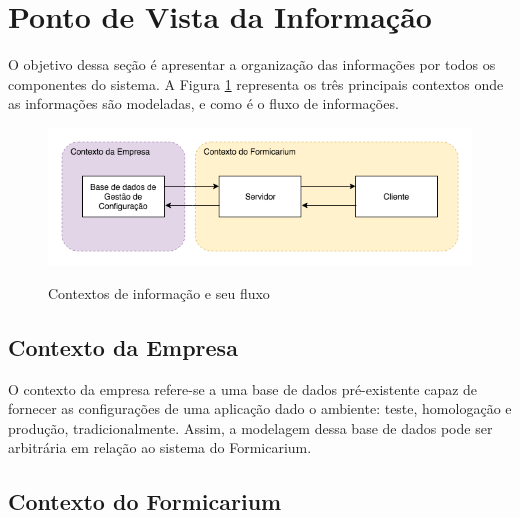 	\section{Ponto de Vista da Informação}
	    O objetivo dessa seção é apresentar a organização das informações por todos os componentes do sistema. A Figura \ref{fig:info-contexts} representa os três principais contextos onde as informações são modeladas, e como é o fluxo de informações. 
	    \begin{figure}[htb]
    	    \centering
    	    \caption{Contextos de informação e seu fluxo}
    	    \includegraphics[scale=0.67]{pictures/especificacao-de-requisitos/information-contexts.png}
    	    \label{fig:info-contexts}
	    \end{figure}
	    \subsection{Contexto da Empresa}
	        O contexto da empresa refere-se a uma base de dados pré-existente capaz de fornecer as configurações de uma aplicação dado o ambiente: teste, homologação e produção, tradicionalmente. Assim, a modelagem dessa base de dados pode ser arbitrária em relação ao sistema do Formicarium.
	    \subsection{Contexto do Formicarium}
